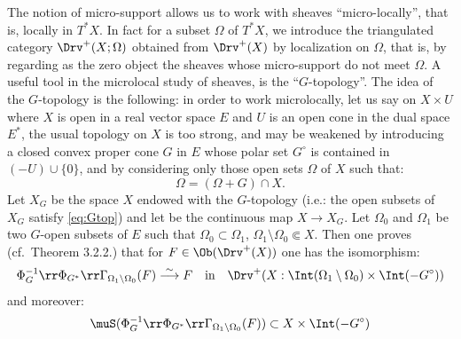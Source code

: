 The notion of micro-support allows us to work with 
sheaves ``micro-locally'', that is, locally in \(T^\ast X\). 
In fact for a subset \(\Omega\) of \(T^\ast X\), 
we introduce the triangulated category \(\Drv^+(X;\Omega)\) 
obtained from \(\Drv^+(X)\) by localization on $\Omega$, 
that is, by regarding as the zero object 
the sheaves whose micro-support do not meet $\Omega$. 
A useful tool in the microlocal study of sheaves, 
is the ``$G$-topology''. 
The idea of the $G$-topology is the following: 
in order to work microlocally, let us say on $X\times U$ 
where $X$ is open in a real vector space $E$ 
and $U$ is an open cone in the dual space $E^\ast$, 
the usual topology on $X$ is too strong, 
and may be weakened by introducing a closed convex proper 
cone $G$ in $E$ whose polar set $G^\circ$ is contained 
in $(-U)\cup\{0\}$, and by considering only those open 
sets $\Omega$ of $X$ such that:
\[
    \Omega = (\Omega+G)\cap X.  \tag*{(0.2)}\label{eq:Gtop}
\]
Let $X_G$ be the space $X$ endowed with 
the $G$-topology (i.e.: the open subsets of $X_G$ satisfy \ref{eq:Gtop}) 
and let be the continuous map $X \to X_G$. 
Let $\Omega_0$ and $\Omega_1$ be two $G$-open subsets 
of $E$ such that \(\Omega_0\subset\Omega_1\), \(\Omega_1\setminus\Omega_0\Subset X\). 
Then one proves (cf.\ Theorem 3.2.2.) 
that for $F \in \Ob(\Drv^{+}(X))$ one has the isomorphism:
\[
    \Phi_{G}^{-1}\rr\Phi_{G^\ast}
    \rr\Gamma_{\Omega_1\setminus\Omega_0}(F)
    \overset{\sim}{\longrightarrow}
    F
    \quad\text{in}\quad
    \Drv^{+}(X:\Int(\Omega_1\setminus\Omega_0)\times \Int(-G^{\circ}))
\]
and moreover:
\[
    \muS(\Phi_{G}^{-1}\rr\Phi_{G^\ast}
    \rr\Gamma_{\Omega_1\setminus\Omega_0}(F))
    \subset
    X\times \Int(-G^{\circ})
\]